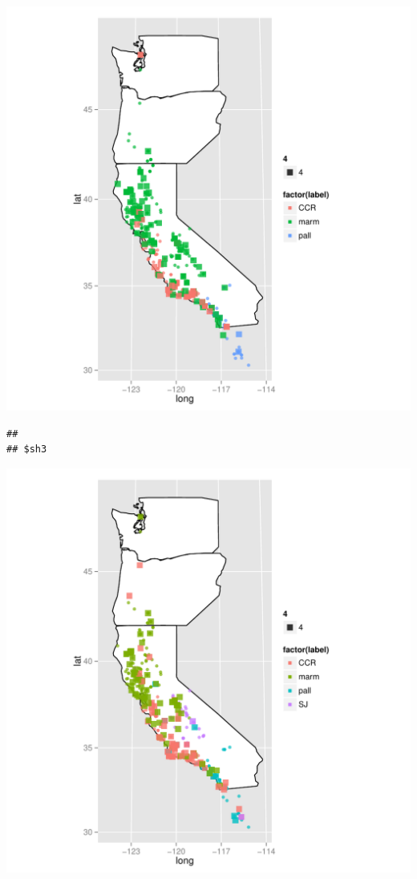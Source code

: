 \documentclass{article}\usepackage{graphicx, color}
\makeatletter
\def\maxwidth{ %
  \ifdim\Gin@nat@width>\linewidth
    \linewidth
  \else
    \Gin@nat@width
  \fi
}
\newenvironment{kframe}{%
 \def\at@end@of@kframe{}%
 \ifinner\ifhmode%
  \def\at@end@of@kframe{\end{minipage}}%
  \begin{minipage}{\columnwidth}%
 \fi\fi%
 \def\FrameCommand##1{\hskip\@totalleftmargin \hskip-\fboxsep
 \colorbox{shadecolor}{##1}\hskip-\fboxsep
     \hskip-\linewidth \hskip-\@totalleftmargin \hskip\columnwidth}%
 \MakeFramed {\advance\hsize-\width
   \@totalleftmargin\z@ \linewidth\hsize
   \@setminipage}}%
 {\par\unskip\endMakeFramed%
 \at@end@of@kframe}
\newenvironment{knitrout}{}{} %
\makeatother
\begin{document}
\begin{knitrout}
\includegraphics[width=\maxwidth]{figure/rf-map2} 
\begin{kframe}\begin{verbatim}
## 
## $sh3
\end{verbatim}
\end{kframe}
\includegraphics[width=\maxwidth]{figure/rf-map3} 

\end{knitrout}
\end{document}
